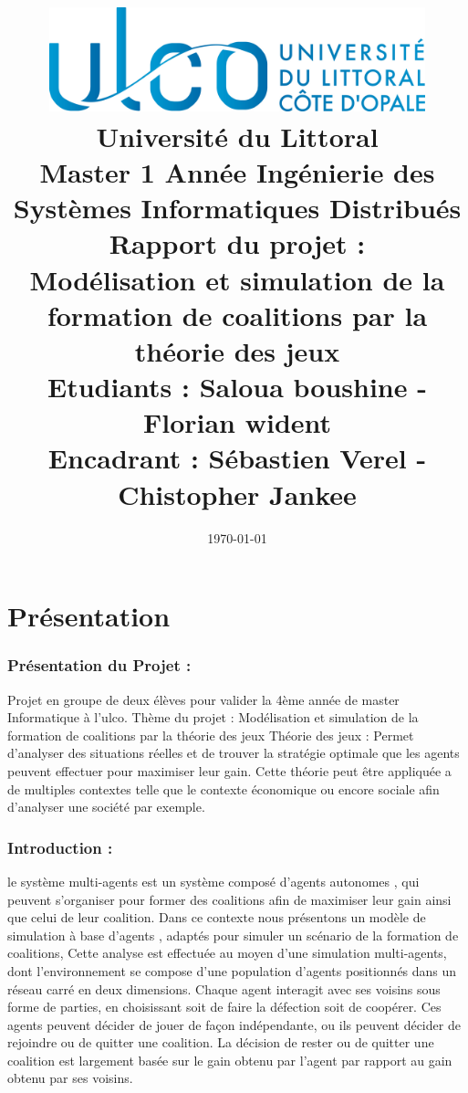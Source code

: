 \documentclass[30pt]{report}
\title{\includegraphics[width=12cm,height=30mm]{logo.jpg} \\ \vspace{15 mm} Université du Littoral \\ Master 1\up{ère} Année Ingénierie des Systèmes Informatiques Distribués \\ \vspace{15 mm} Rapport du projet : \\ Modélisation et simulation de la formation de coalitions par la théorie des jeux \\ \vspace{10 mm} Etudiants : Saloua boushine - Florian wident\\ Encadrant : Sébastien Verel - Chistopher Jankee }
\date{\today}
\begin{document}
\maketitle

\renewcommand{\contentsname}{Sommaire}
\tableofcontents
\part{Présentation}
\section{Présentation du Projet  :}
Projet en groupe de deux élèves pour valider la 4ème année de master Informatique à l'ulco.
\newline
\newline
 Thème du projet : Modélisation et simulation de la formation de coalitions par la théorie des jeux
\newline
\newline
Théorie des jeux : Permet d'analyser des situations réelles et de trouver la stratégie optimale que les agents peuvent effectuer pour maximiser leur gain.
Cette théorie peut être appliquée a de multiples contextes telle que le contexte économique ou encore sociale afin d'analyser une société par exemple.
\newline

\section{Introduction  :}
	le système multi-agents est un système composé d'agents autonomes , qui peuvent s'organiser pour former des coalitions afin de maximiser leur gain ainsi que celui de leur coalition. 
	\newline
	\newline
	Dans ce contexte nous présentons un modèle de simulation à base d'agents , adaptés pour simuler un scénario de la formation de coalitions, Cette analyse est effectuée au moyen d'une simulation multi-agents, dont l'environnement se compose d'une population d'agents positionnés dans un réseau carré en deux dimensions. 
	\newline
	\newline
	 Chaque agent interagit avec ses voisins sous forme de parties, en choisissant soit  de faire la défection soit de coopérer. Ces agents peuvent décider de jouer de façon indépendante, ou ils peuvent décider de rejoindre ou de quitter une coalition. 
	 \newline
	 \newline
	La décision de rester ou de quitter une coalition est largement basée sur le gain obtenu par l'agent par rapport au gain obtenu par ses voisins.
	\newline
\end{document}
